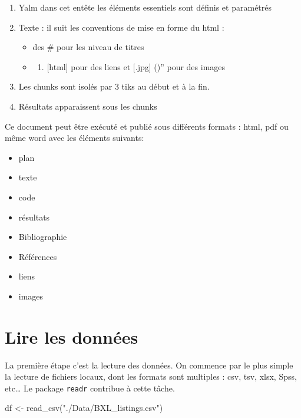 \documentclass[
]{book}
\newenvironment{Shaded}{\begin{snugshade}}{\end{snugshade}}
\newcommand{\FunctionTok}[1]{\textcolor[rgb]{0.00,0.00,0.00}{#1}}
\newcommand{\NormalTok}[1]{#1}
\newcommand{\OtherTok}[1]{\textcolor[rgb]{0.56,0.35,0.01}{#1}}
\newcommand{\StringTok}[1]{\textcolor[rgb]{0.31,0.60,0.02}{#1}}
\providecommand{\tightlist}{%
  \setlength{\itemsep}{0pt}\setlength{\parskip}{0pt}}
\begin{document}
\begin{enumerate}
\def\labelenumi{\arabic{enumi}.}
\tightlist
\item
  Yalm dans cet entête les éléments essentiels sont définis et paramétrés
\item
  Texte : il suit les conventions de mise en forme du html :

  \begin{itemize}
  \item
    des \# pour les niveau de titres
  \item
    \begin{enumerate}
    \def\labelenumii{(\alph{enumii})}
    \setcounter{enumii}{23}
    \tightlist
    \item
      {[}html{]} pour des liens et {[}.jpg{]} ()'' pour des images
    \end{enumerate}
  \end{itemize}
\item
  Les chunks sont isolés par 3 tiks au début et à la fin.
\item
  Résultats apparaissent sous les chunks
\end{enumerate}

Ce document peut être exécuté et publié sous différents formats : html, pdf ou même word avec les éléments suivants:

\begin{itemize}
\tightlist
\item
  plan
\item
  texte
\item
  code
\item
  résultats
\item
  Bibliographie
\item
  Références
\item
  liens
\item
  images
\end{itemize}

\hypertarget{lire-les-donnuxe9es}{%
\section{Lire les données}\label{lire-les-donnuxe9es}}

La première étape c'est la lecture des données. On commence par le plus simple la lecture de fichiers locaux, dont les formats sont multiples : csv, tsv, xlsx, Spss, etc\ldots{} Le package \texttt{readr} contribue à cette tâche.

\begin{Shaded}
\begin{Highlighting}[]
\NormalTok{df }\OtherTok{\textless{}{-}} \FunctionTok{read\_csv}\NormalTok{(}\StringTok{"./Data/BXL\_listings.csv"}\NormalTok{)}
\end{Highlighting}
\end{Shaded}
\end{document}

